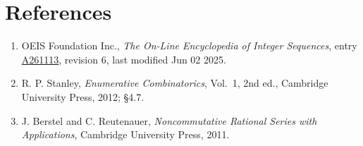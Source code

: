 \documentclass[11pt]{article}
\theoremstyle{definition}
\begin{document}
\section{References}

\begin{enumerate}

\item OEIS Foundation Inc., \emph{The On-Line Encyclopedia of Integer Sequences}, entry \href{https://oeis.org/A261113}{A261113}, revision 6, last modified Jun 02 2025.

\item R. P. Stanley, \emph{Enumerative Combinatorics}, Vol.~1, 2nd ed., Cambridge University Press, 2012; \S4.7.

\item J. Berstel and C. Reutenauer, \emph{Noncommutative Rational Series with Applications}, Cambridge University Press, 2011.

\end{enumerate}
\end{document}
